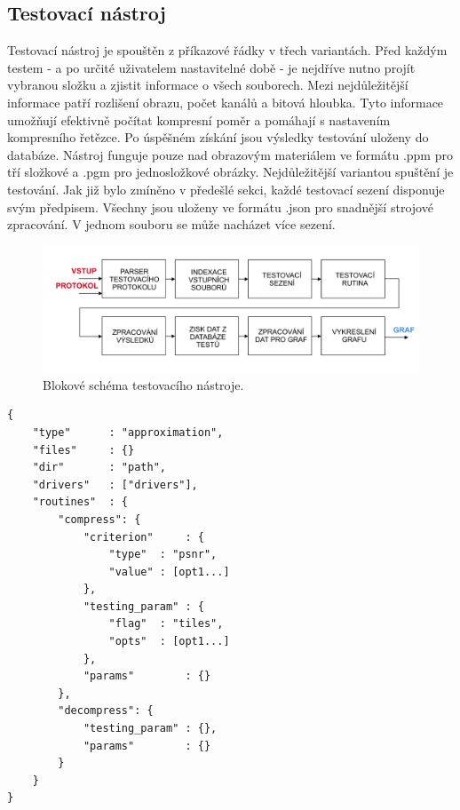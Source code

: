 \subsection*{Testovací nástroj}
Testovací nástroj je spouštěn z příkazové řádky v třech variantách. Před každým testem - a po určité uživatelem nastavitelné době - je nejdříve nutno projít vybranou složku a zjistit informace o všech souborech. Mezi nejdůležitější informace patří rozlišení obrazu, počet kanálů a bitová hloubka. Tyto informace umožňují efektivně počítat kompresní poměr a pomáhají s nastavením kompresního řetězce. Po úspěšném získání jsou výsledky testování uloženy do databáze. Nástroj funguje pouze nad obrazovým materiálem ve formátu .ppm pro tří složkové a .pgm pro jednosložkové obrázky. Nejdůležitější variantou spuštění je testování. Jak již bylo zmíněno v předešlé sekci, každé testovací sezení disponuje svým předpisem. Všechny jsou uloženy ve formátu .json pro snadnější strojové zpracování. V jednom souboru se může nacházet více sezení. 


\begin{figure}[hbt!]
  \hspace*{-0.5cm}
  \includegraphics[width=16cm]{obrazky-figures/schema.pdf}
  \caption{Blokové schéma testovacího nástroje.}
  \label{retezec}
\end{figure}

\clearpage

\begin{lstlisting}
{
    "type"      : "approximation",
    "files"     : {}
    "dir"       : "path",
    "drivers"   : ["drivers"],
    "routines"  : {
        "compress": {   
            "criterion"     : {
                "type"  : "psnr",
                "value" : [opt1...]
            },
            "testing_param" : {
                "flag"  : "tiles",
                "opts"  : [opt1...]
            },
            "params"        : {}
        },
        "decompress": {
            "testing_param" : {},
            "params"        : {}
        }
    }
}
\end{lstlisting}

